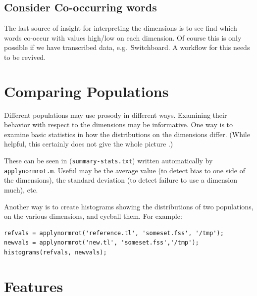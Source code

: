 \documentclass[11pt]{article}
\begin{document}
\subsection{Consider Co-occurring words} 

The last source of insight for interpreting the dimensions is to see
find which words co-occur with values high/low on each dimension.  Of
course this is only possible if we have transcribed data,
e.g.~Switchboard.  A workflow for this needs to be revived.


\section{Comparing Populations}

Different populations may use prosody in different ways.  Examining
their behavior with respect to the dimensions may be informative.  One
way is to examine basic statistics in how the distributions on the
dimensions differ.  (While helpful, this certainly does not give the
whole picture \cite{l2english}.)

These can be seen in ({\tt summary-stats.txt}) written automatically
by {\tt applynormrot.m}.  Useful  may be the 
average value (to detect bias to one side of the dimensions), 
the standard deviation (to detect failure to use a dimension much), etc. 

Another way is to create histograms showing the distributions of two
populations, on the various dimensions, and eyeball them.  For example:

\begin{verbatim}
refvals = applynormrot('reference.tl', 'someset.fss', '/tmp');
newvals = applynormrot('new.tl', 'someset.fss','/tmp');
histograms(refvals, newvals);
\end{verbatim}




\section{Features}               \label{sec:features}
\end{document}
